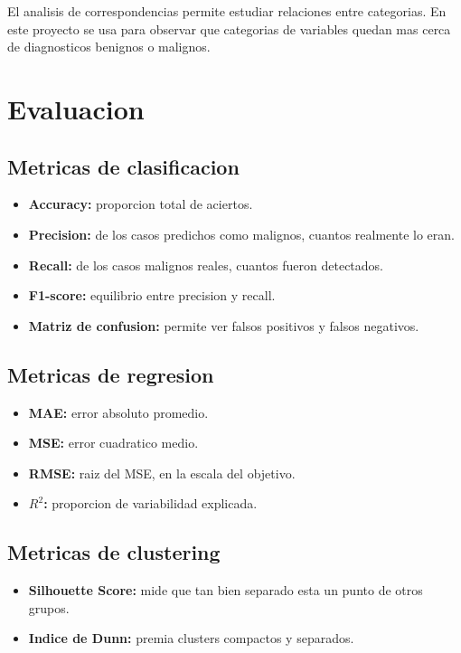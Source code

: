 \documentclass[12pt,letterpaper]{article}
\begin{document}
El analisis de correspondencias permite estudiar relaciones entre categorias. En este proyecto se usa para observar que categorias de variables quedan mas cerca de diagnosticos benignos o malignos.

\section{Evaluacion}

\subsection{Metricas de clasificacion}

\begin{itemize}[leftmargin=*]
    \item \textbf{Accuracy:} proporcion total de aciertos.
    \item \textbf{Precision:} de los casos predichos como malignos, cuantos realmente lo eran.
    \item \textbf{Recall:} de los casos malignos reales, cuantos fueron detectados.
    \item \textbf{F1-score:} equilibrio entre precision y recall.
    \item \textbf{Matriz de confusion:} permite ver falsos positivos y falsos negativos.
\end{itemize}

\subsection{Metricas de regresion}

\begin{itemize}[leftmargin=*]
    \item \textbf{MAE:} error absoluto promedio.
    \item \textbf{MSE:} error cuadratico medio.
    \item \textbf{RMSE:} raiz del MSE, en la escala del objetivo.
    \item \textbf{$R^2$:} proporcion de variabilidad explicada.
\end{itemize}

\subsection{Metricas de clustering}

\begin{itemize}[leftmargin=*]
    \item \textbf{Silhouette Score:} mide que tan bien separado esta un punto de otros grupos.
    \item \textbf{Indice de Dunn:} premia clusters compactos y separados.
\end{itemize}
\end{document}

